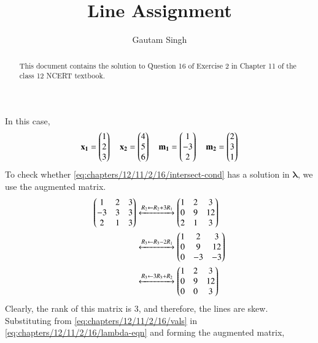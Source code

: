 \documentclass[journal,12pt,twocolumn]{IEEEtran}
\renewcommand{\vec}[1]{\boldsymbol{\mathbf{#1}}}
\begin{document}
\vspace{3cm}
\title{Line Assignment}
\author{Gautam Singh}
\maketitle
\bigskip

\begin{abstract}
    This document contains the solution to Question 16 of Exercise 2 in Chapter
    11 of the class 12 NCERT textbook.
\end{abstract}
\fi
    In this case,
    \begin{align}
        \vec{x_1} = \myvec{1\\2\\3} \quad \vec{x_2} = \myvec{4\\5\\6}
        \quad \vec{m_1} = \myvec{1\\-3\\2} \quad \vec{m_2} = \myvec{2\\3\\1}
        \label{eq:chapters/12/11/2/16/vals}
    \end{align}
    To check whether \eqref{eq:chapters/12/11/2/16/intersect-cond} has a solution in $\vec{\lambda}$,
    we use the augmented matrix.
    \begin{align}
        \begin{pmatrix}1&2&3\\-3&3&3\\2&1&3\end{pmatrix} &\xleftrightarrow[]{R_2\leftarrow R_2+3R_1} \begin{pmatrix}1&2&3\\0&9&12\\2&1&3\end{pmatrix} \\
                &\xleftrightarrow[]{R_3\leftarrow R_3-2R_1} \begin{pmatrix}1&2&3\\0&9&12\\0&-3&-3\end{pmatrix} \\
                &\xleftrightarrow[]{R_3\leftarrow 3R_3+R_2} \begin{pmatrix}1&2&3\\0&9&12\\0&0&3\end{pmatrix}
                \label{eq:chapters/12/11/2/16/rank-aug}
    \end{align}
    Clearly, the rank of this matrix is 3, and therefore, the lines are skew.
%
    Substituting from \eqref{eq:chapters/12/11/2/16/vals} in \eqref{eq:chapters/12/11/2/16/lambda-eqn} and forming the 
    augmented matrix,
\end{document}
